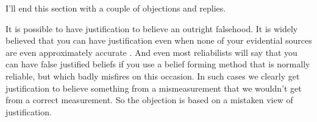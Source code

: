 I'll end this section with a couple of objections and replies.

%
%

{It is possible to have justification to believe an outright falsehood. It is widely believed that you can have justification even when none of your evidential sources are even approximately accurate \citep{Cohen1984}. And even most reliabilists will say that you can have false justified beliefs if you use a belief forming method that is normally reliable, but which badly misfires on this occasion. In such cases we clearly get justification to believe something from a mismeasurement that we wouldn't get from a correct measurement. So the objection is based on a mistaken view of justification.}

